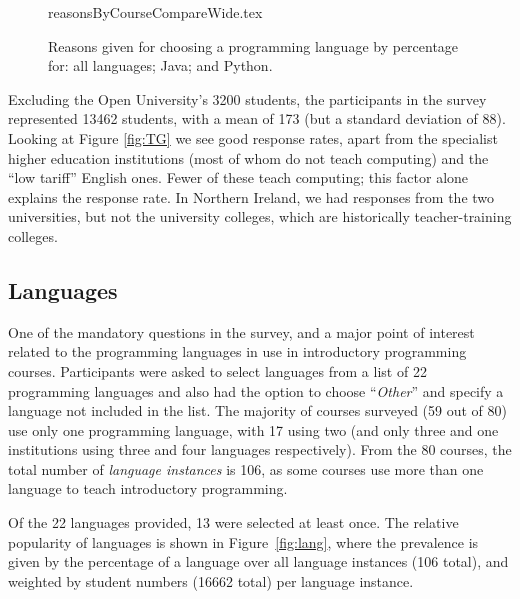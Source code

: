 \documentclass[a4paper,11pt]{article}
\begin{document}
\begin{figure}
\begin{center}
{reasonsByCourseCompareWide.tex}
\end{center}
\caption{Reasons given for choosing a programming language by percentage for: all languages; Java; and Python.\label{fig:reasons}}
\end{figure}

Excluding the Open University's 3200 students, the participants in the
survey represented 13462 students, with a mean of 173 (but a standard
deviation of 88). Looking at Figure \ref{fig:TG} we see good response
rates, apart from the specialist higher education institutions (most
of whom do not teach computing) and the ``low tariff'' English
ones. Fewer of these teach computing; this factor alone explains the
response rate. In Northern Ireland, we had responses from the two
universities, but not the university colleges, which are historically
teacher-training colleges.

\subsection{Languages}\label{langs}


One of the mandatory questions in the survey, and a major point of
interest related to the programming languages in use in introductory
programming courses. Participants were asked to select languages from
a list of 22 programming languages and also had the option to choose
``{\emph{Other}}'' and specify a language not included in the list. The
majority of courses surveyed (59 out of 80) use only one programming
language, with 17 using two (and only three and one institutions using
three and four languages respectively). From the 80 courses, the total
number of {\emph{language instances}} is 106, as some courses use more
than one language to teach introductory programming.

Of the 22 languages provided, 13 were selected at least once. The
relative popularity of languages is shown in Figure~\ref{fig:lang},
where the prevalence is given by the percentage of a language over all
language instances (106 total), and weighted by student numbers (16662
total) per language instance. 
\end{document}
